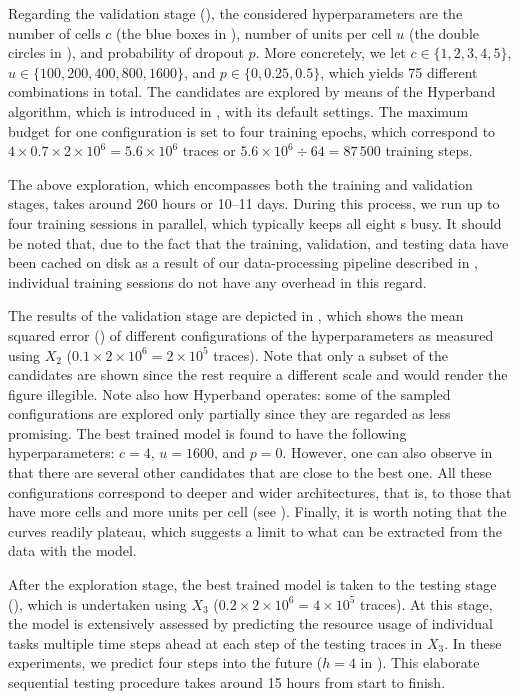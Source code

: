 Regarding the validation stage (), the considered
hyperparameters are the number of cells $c$ (the blue boxes in ),
number of units per cell $u$ (the double circles in ), and
probability of dropout $p$. More concretely, we let $c \in \{1, 2, 3, 4, 5\}$,
$u \in \{100, 200, 400, 800, 1600\}$, and $p \in \{0, 0.25, 0.5\}$, which yields
75 different combinations in total. The candidates are explored by means of the
Hyperband algorithm, which is introduced in , with its default
settings. The maximum budget for one configuration is set to four training
epochs, which correspond to $4 \times 0.7 \times 2 \times 10^6 = 5.6 \times
10^6$ traces or $5.6 \times 10^6 \div 64 = 87\,500$ training steps.

The above exploration, which encompasses both the training and validation
stages, takes around 260 hours or 10--11 days. During this process, we run up to
four training sessions in parallel, which typically keeps all eight s
busy. It should be noted that, due to the fact that the training, validation,
and testing data have been cached on disk as a result of our data-processing
pipeline described in , individual training sessions do not have any
overhead in this regard.



The results of the validation stage are depicted in , which
shows the mean squared error () of different configurations of the
hyperparameters as measured using $X_2$ ($0.1 \times 2 \times 10^6 = 2 \times
10^5$ traces). Note that only a subset of the candidates are shown since the
rest require a different scale and would render the figure illegible. Note also
how Hyperband operates: some of the sampled configurations are explored only
partially since they are regarded as less promising. The best trained model is
found to have the following hyperparameters: $c = 4$, $u = 1600$, and $p = 0$.
However, one can also observe in  that there are several other
candidates that are close to the best one. All these configurations correspond
to deeper and wider architectures, that is, to those that have more cells and
more units per cell (see ). Finally, it is worth noting that the
curves readily plateau, which suggests a limit to what can be extracted from the
data with the model.

After the exploration stage, the best trained model is taken to the testing
stage (), which is undertaken using $X_3$ ($0.2 \times 2 \times
10^6 = 4 \times 10^5$ traces). At this stage, the model is extensively assessed
by predicting the resource usage of individual tasks multiple time steps ahead
at each step of the testing traces in $X_3$. In these experiments, we predict
four steps into the future ($h = 4$ in ). This elaborate
sequential testing procedure takes around 15 hours from start to finish.

